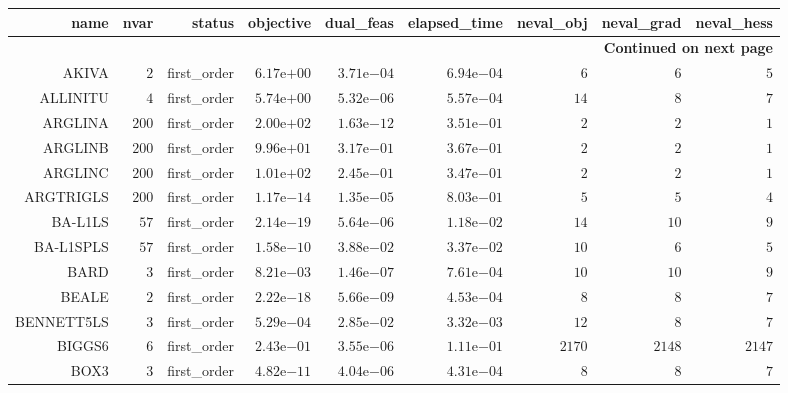 \begin{longtable}{rrrrrrrrr}
\hline
name & nvar & status & objective & dual\_feas & elapsed\_time & neval\_obj & neval\_grad & neval\_hess \\\hline
\endhead
\hline
\multicolumn{9}{r}{{\bfseries Continued on next page}}\\
\hline
\endfoot
\endlastfoot
AKIVA & \(     2\) & first\_order & \( 6.17\)e\(+00\) & \( 3.71\)e\(-04\) & \( 6.94\)e\(-04\) & \(     6\) & \(     6\) & \(     5\) \\
ALLINITU & \(     4\) & first\_order & \( 5.74\)e\(+00\) & \( 5.32\)e\(-06\) & \( 5.57\)e\(-04\) & \(    14\) & \(     8\) & \(     7\) \\
ARGLINA & \(   200\) & first\_order & \( 2.00\)e\(+02\) & \( 1.63\)e\(-12\) & \( 3.51\)e\(-01\) & \(     2\) & \(     2\) & \(     1\) \\
ARGLINB & \(   200\) & first\_order & \( 9.96\)e\(+01\) & \( 3.17\)e\(-01\) & \( 3.67\)e\(-01\) & \(     2\) & \(     2\) & \(     1\) \\
ARGLINC & \(   200\) & first\_order & \( 1.01\)e\(+02\) & \( 2.45\)e\(-01\) & \( 3.47\)e\(-01\) & \(     2\) & \(     2\) & \(     1\) \\
ARGTRIGLS & \(   200\) & first\_order & \( 1.17\)e\(-14\) & \( 1.35\)e\(-05\) & \( 8.03\)e\(-01\) & \(     5\) & \(     5\) & \(     4\) \\
BA-L1LS & \(    57\) & first\_order & \( 2.14\)e\(-19\) & \( 5.64\)e\(-06\) & \( 1.18\)e\(-02\) & \(    14\) & \(    10\) & \(     9\) \\
BA-L1SPLS & \(    57\) & first\_order & \( 1.58\)e\(-10\) & \( 3.88\)e\(-02\) & \( 3.37\)e\(-02\) & \(    10\) & \(     6\) & \(     5\) \\
BARD & \(     3\) & first\_order & \( 8.21\)e\(-03\) & \( 1.46\)e\(-07\) & \( 7.61\)e\(-04\) & \(    10\) & \(    10\) & \(     9\) \\
BEALE & \(     2\) & first\_order & \( 2.22\)e\(-18\) & \( 5.66\)e\(-09\) & \( 4.53\)e\(-04\) & \(     8\) & \(     8\) & \(     7\) \\
BENNETT5LS & \(     3\) & first\_order & \( 5.29\)e\(-04\) & \( 2.85\)e\(-02\) & \( 3.32\)e\(-03\) & \(    12\) & \(     8\) & \(     7\) \\
BIGGS6 & \(     6\) & first\_order & \( 2.43\)e\(-01\) & \( 3.55\)e\(-06\) & \( 1.11\)e\(-01\) & \(  2170\) & \(  2148\) & \(  2147\) \\
BOX3 & \(     3\) & first\_order & \( 4.82\)e\(-11\) & \( 4.04\)e\(-06\) & \( 4.31\)e\(-04\) & \(     8\) & \(     8\) & \(     7\) \\

\end{longtable}
